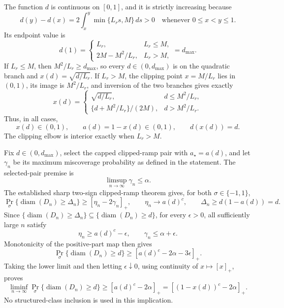 The function \(d\) is continuous on \([0,1]\), and it is strictly increasing because
\[
 d(y)-d(x)=2\int_x^y\min\{L_rs,M\}\,ds>0
 \quad\text{whenever }0\le x<y\le1.
\]
Its endpoint value is
\[
 d(1)=
 \begin{cases}
 L_r,&L_r\le M,\\
 2M-M^2/L_r,&L_r>M,
 \end{cases}
 =d_{\max}.
\]
If \(L_r\le M\), then \(M^2/L_r\ge d_{\max}\), so every \(d\in(0,d_{\max})\) is on the quadratic branch and \(x(d)=\sqrt{d/L_r}\). If \(L_r>M\), the clipping point \(x=M/L_r\) lies in \((0,1)\), its image is \(M^2/L_r\), and inversion of the two branches gives exactly
\[
 x(d)=
 \begin{cases}
 \sqrt{d/L_r},&d\le M^2/L_r,\\
 \{d+M^2/L_r\}/(2M),&d>M^2/L_r.
 \end{cases}
\]
Thus, in all cases,
\[
 x(d)\in(0,1),\qquad a(d)=1-x(d)\in(0,1),
 \qquad d(x(d))=d.
\]
The clipping elbow is interior exactly when \(L_r>M\).

Fix \(d\in(0,d_{\max})\), select the capped clipped-ramp pair with \(a_\star=a(d)\), and let \(\gamma_n\) be its maximum miscoverage probability as defined in the statement. The selected-pair premise is
\[
 \limsup_{n\to\infty}\gamma_n\le\alpha.
\]
The established sharp two-sign clipped-ramp theorem gives, for both \(\sigma\in\{-1,1\}\),
\[
 \Pr_\sigma\{\operatorname{diam}(D_n)\ge\Delta_n\}
 \ge[\eta_n-2\gamma_n]_+,
 \qquad
 \eta_n\longrightarrow a(d)^c,
 \qquad
 \Delta_n\ge d(1-a(d))=d.
\]
Since \(\{\operatorname{diam}(D_n)\ge\Delta_n\}\subseteq
\{\operatorname{diam}(D_n)\ge d\}\), for every \(\epsilon>0\), all sufficiently large \(n\) satisfy
\[
 \eta_n\ge a(d)^c-\epsilon,
 \qquad
 \gamma_n\le\alpha+\epsilon.
\]
Monotonicity of the positive-part map then gives
\[
 \Pr_\sigma\{\operatorname{diam}(D_n)\ge d\}
 \ge[a(d)^c-2\alpha-3\epsilon]_+.
\]
Taking the lower limit and then letting \(\epsilon\downarrow0\), using continuity of \(x\mapsto[x]_+\), proves
\[
 \liminf_{n\to\infty}
 \Pr_\sigma\{\operatorname{diam}(D_n)\ge d\}
 \ge[a(d)^c-2\alpha]_+
 =[(1-x(d))^c-2\alpha]_+.
\]
No structured-class inclusion is used in this implication.

